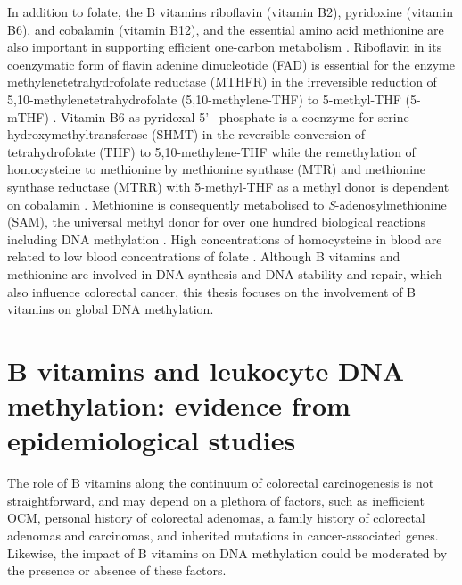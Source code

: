 \noindent In addition to folate, the B vitamins riboflavin (vitamin B2), pyridoxine (vitamin B6), and cobalamin (vitamin B12), and the essential amino acid methionine are also important in supporting efficient one-carbon metabolism \cite{c197}. Riboflavin in its coenzymatic form of flavin adenine dinucleotide (FAD) is essential for the enzyme methylenetetrahydrofolate reductase (MTHFR) in the irreversible reduction of 5,10-methylenetetrahydrofolate (5,10-methylene-THF) to 5-methyl-THF (5-mTHF) \cite{c198}. Vitamin B6 as pyridoxal 5'\ -phosphate is a coenzyme for serine hydroxymethyltransferase (SHMT) in the reversible conversion of tetrahydrofolate (THF) to 5,10-methylene-THF \cite{c199} while the remethylation of homocysteine to methionine by methionine synthase (MTR) and methionine synthase reductase (MTRR) with 5-methyl-THF as a methyl donor is dependent on cobalamin \cite{c1100,c1101}. Methionine is consequently metabolised to \textit{S}-adenosylmethionine (SAM), the universal methyl donor for over one hundred biological reactions including DNA methylation \cite{c1102}. High concentrations of homocysteine in blood are related to low blood concentrations of folate \cite{c1103}. Although B vitamins and methionine are involved in DNA synthesis and DNA stability and repair, which also influence colorectal cancer, this thesis focuses on the involvement of B vitamins on global DNA methylation.

\section[]{B vitamins and leukocyte DNA methylation: evidence from \\ epidemiological studies} %
\noindent The role of B vitamins along the continuum of colorectal carcinogenesis is not straightforward, and may depend on a plethora of factors, such as inefficient OCM, personal history of colorectal adenomas, a family history of colorectal adenomas and carcinomas, and inherited mutations in cancer-associated genes. Likewise, the impact of B vitamins on DNA methylation could be moderated by the presence or absence of these factors. 


